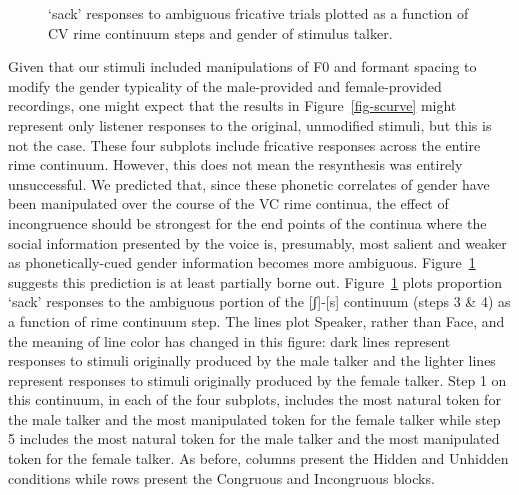 \documentclass[
  letterpaper,
  DIV=11,
  numbers=noendperiod]{scrartcl}
\begin{document}
\begin{figure}


\caption{\label{fig-rimes}`sack' responses to ambiguous fricative trials
plotted as a function of CV rime continuum steps and gender of stimulus
talker.}

\end{figure}%

Given that our stimuli included manipulations of F0 and formant spacing
to modify the gender typicality of the male-provided and female-provided
recordings, one might expect that the results in Figure~\ref{fig-scurve}
might represent only listener responses to the original, unmodified
stimuli, but this is not the case. These four subplots include fricative
responses across the entire rime continuum. However, this does not mean
the resynthesis was entirely unsuccessful. We predicted that, since
these phonetic correlates of gender have been manipulated over the
course of the VC rime continua, the effect of incongruence should be
strongest for the end points of the continua where the social
information presented by the voice is, presumably, most salient and
weaker as phonetically-cued gender information becomes more ambiguous.
Figure~\ref{fig-rimes} suggests this prediction is at least partially
borne out. Figure~\ref{fig-rimes} plots proportion `sack' responses to
the ambiguous portion of the {[}ʃ{]}-{[}s{]} continuum (steps 3 \& 4) as
a function of rime continuum step. The lines plot Speaker, rather than
Face, and the meaning of line color has changed in this figure: dark
lines represent responses to stimuli originally produced by the male
talker and the lighter lines represent responses to stimuli originally
produced by the female talker. Step 1 on this continuum, in each of the
four subplots, includes the most natural token for the male talker and
the most manipulated token for the female talker while step 5 includes
the most natural token for the male talker and the most manipulated
token for the female talker. As before, columns present the Hidden and
Unhidden conditions while rows present the Congruous and Incongruous
blocks.
\end{document}
